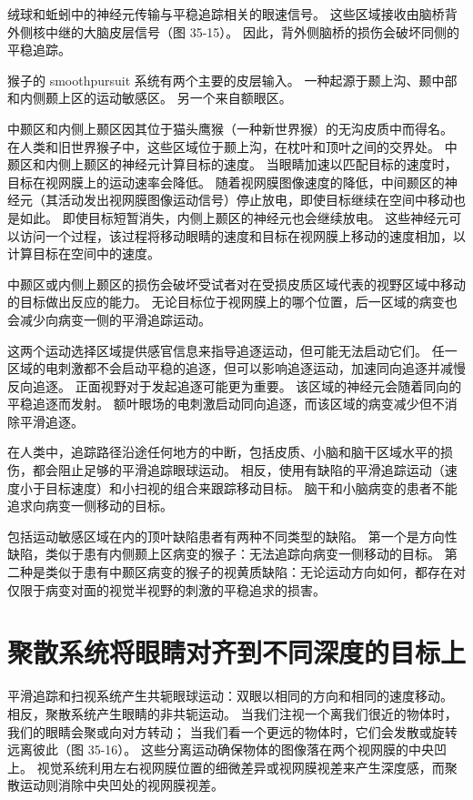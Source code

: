 绒球和蚯蚓中的神经元传输与平稳追踪相关的眼速信号。 这些区域接收由脑桥背外侧核中继的大脑皮层信号（图 35-15）。 因此，背外侧脑桥的损伤会破坏同侧的平稳追踪。

猴子的 smoothpursuit 系统有两个主要的皮层输入。 一种起源于颞上沟、颞中部和内侧颞上区的运动敏感区。 另一个来自额眼区。

中颞区和内侧上颞区因其位于猫头鹰猴（一种新世界猴）的无沟皮质中而得名。 在人类和旧世界猴子中，这些区域位于颞上沟，在枕叶和顶叶之间的交界处。 中颞区和内侧上颞区的神经元计算目标的速度。 当眼睛加速以匹配目标的速度时，目标在视网膜上的运动速率会降低。 随着视网膜图像速度的降低，中间颞区的神经元（其活动发出视网膜图像运动信号）停止放电，即使目标继续在空间中移动也是如此。 即使目标短暂消失，内侧上颞区的神经元也会继续放电。 这些神经元可以访问一个过程，该过程将移动眼睛的速度和目标在视网膜上移动的速度相加，以计算目标在空间中的速度。

中颞区或内侧上颞区的损伤会破坏受试者对在受损皮质区域代表的视野区域中移动的目标做出反应的能力。 无论目标位于视网膜上的哪个位置，后一区域的病变也会减少向病变一侧的平滑追踪运动。

这两个运动选择区域提供感官信息来指导追逐运动，但可能无法启动它们。 任一区域的电刺激都不会启动平稳的追逐，但可以影响追逐运动，加速同向追逐并减慢反向追逐。 正面视野对于发起追逐可能更为重要。 该区域的神经元会随着同向的平稳追逐而发射。 额叶眼场的电刺激启动同向追逐，而该区域的病变减少但不消除平滑追逐。

在人类中，追踪路径沿途任何地方的中断，包括皮质、小脑和脑干区域水平的损伤，都会阻止足够的平滑追踪眼球运动。 相反，使用有缺陷的平滑追踪运动（速度小于目标速度）和小扫视的组合来跟踪移动目标。 脑干和小脑病变的患者不能追求向病变一侧移动的目标。

包括运动敏感区域在内的顶叶缺陷患者有两种不同类型的缺陷。 第一个是方向性缺陷，类似于患有内侧颞上区病变的猴子：无法追踪向病变一侧移动的目标。 第二种是类似于患有中颞区病变的猴子的视黄质缺陷：无论运动方向如何，都存在对仅限于病变对面的视觉半视野的刺激的平稳追求的损害。


\section{聚散系统将眼睛对齐到不同深度的目标上}
平滑追踪和扫视系统产生共轭眼球运动：双眼以相同的方向和相同的速度移动。 相反，聚散系统产生眼睛的非共轭运动。 当我们注视一个离我们很近的物体时，我们的眼睛会聚或向对方转动； 当我们看一个更远的物体时，它们会发散或旋转远离彼此（图 35-16）。 这些分离运动确保物体的图像落在两个视网膜的中央凹上。 视觉系统利用左右视网膜位置的细微差异或视网膜视差来产生深度感，而聚散运动则消除中央凹处的视网膜视差。

